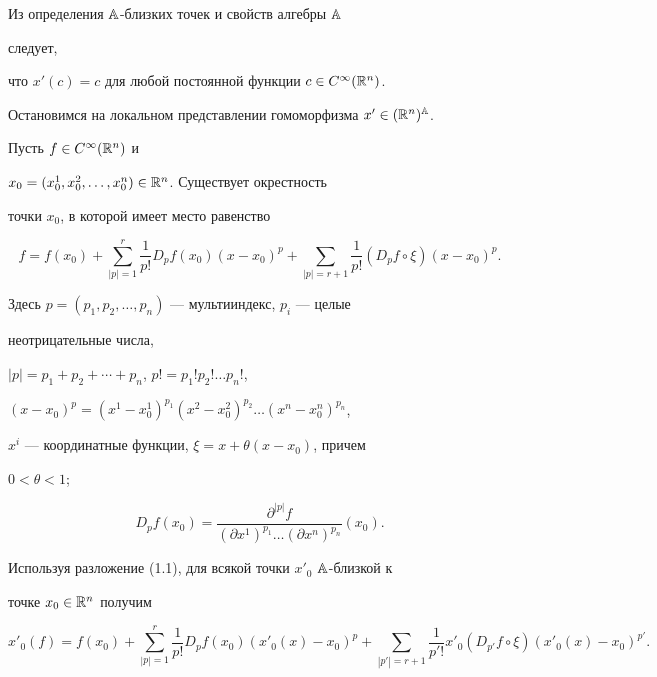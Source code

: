 Из определения $\Bbb A$-близких точек и свойств алгебры $\Bbb A$ 


следует, 


что $x'(c)=c$ для любой постоянной функции $c\in C^\infty(\Bbb R^n)$. 


 


Остановимся на локальном представлении гомоморфизма $x'\in(\Bbb 


R^n)\A$. 


Пусть $f\in C^\infty(\Bbb R^n)$ и 


$x_0=(x^1_0,x^2_0,\dotsc,x^n_0)\in\Bbb R^n$. Существует окрестность 


точки $x_0$, в которой имеет место равенство 


\begin{equation} 


f=f(x_0)+\sum^r_{|p|=1}\frac{1}{p!}D_p f(x_0)(x-x_0)^p+ 


\sum_{|p|=r+1}\frac{1}{p!}(D_p f\circ\xi)(x-x_0)^p. 


\end{equation} 


Здесь $p=(p_1,p_2,\dotsc,p_n)$ --- мультииндекс, $p_i$ --- целые 


неотрицательные числа,  


$|p|=p_1+p_2+\dotsb+p_n$, $p!=p_1!p_2!\dotsc p_n!$, 


$(x-x_0)^p=(x^1-x^1_0)^{p_1}(x^2-x^2_0)^{p_2}\dotsc(x^n-x^n_0)^{p_n}$, 


$x^i$ --- координатные функции, $\xi=x+\theta(x-x_0)$, причем 


$0<\theta<1$; 


$$ 


D_p f(x_0)=\frac{\partial^{|p|}f} 


{(\partial x^1)^{p_1}\dotsc(\partial x^n)^{p_n}}(x_0). 


$$ 


 


Используя разложение (1.1), для всякой точки $x'_0$\; $\Bbb A$-близкой к 


точке $x_0\in\Bbb R^n$ получим 


$$ 


x'_0(f)=f(x_0)+\sum^r_{|p|=1}\frac{1}{p!}D_p 


f(x_0)(x'_0(x)-x_0)^p+\sum_{|p'|=r+1}\frac{1}{p'!}x'_0 


(D_{p'}f\circ\xi)(x'_0(x)-x_0)^{p'}. 


$$ 


